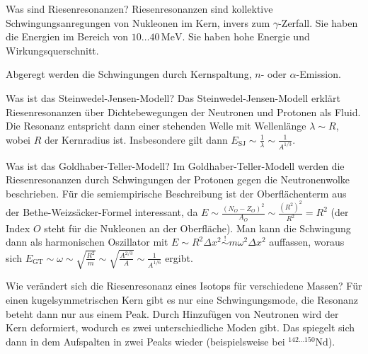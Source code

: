 
\begin{fquestion}{Was sind Riesenresonanzen?}
    Riesenresonanzen sind kollektive Schwingungsanregungen von Nukleonen im Kern, invers zum $\gamma$-Zerfall. 
    Sie haben die Energien im Bereich von $10\ldots 40\, \si{\mega\electronvolt}$. 
    Sie haben hohe Energie und Wirkungsquerschnitt.  
    
    Abgeregt werden die Schwingungen durch Kernspaltung, $n$- oder $\alpha$-Emission.
\end{fquestion}

\begin{fquestion}{Was ist das Steinwedel-Jensen-Modell?}
    Das Steinwedel-Jensen-Modell erklärt Riesenresonanzen über Dichtebewegungen der Neutronen und Protonen als Fluid.
    Die Resonanz entspricht dann einer stehenden Welle mit Wellenlänge $\lambda \sim R$, wobei  $R$ der Kernradius ist.
    Insbesondere gilt dann $E_\mathrm{SJ} \sim \frac{1}{\lambda} \sim \frac{1}{A^{1/3}}$.
\end{fquestion}

\begin{fquestion}{Was ist das Goldhaber-Teller-Modell?}
    Im Goldhaber-Teller-Modell werden die Riesenresonanzen durch Schwingungen der Protonen gegen die Neutronenwolke beschrieben.
    Für die semiempirische Beschreibung ist der Oberflächenterm aus der Bethe-Weizsäcker-Formel interessant, da $E\sim \frac{(N_O - Z_O)^2}{A_O} \sim \frac{ (R^2)^2}{R^2} = R^2$ (der Index $O$ steht für die Nukleonen an der Oberfläche).
    Man kann die Schwingung dann als harmonischen Oszillator mit $E\sim R^2\Delta x^2 \overset{!}{\sim} m\omega^2\Delta x^2$ auffassen, woraus sich $E_\mathrm{GT}\sim \omega\sim \sqrt{\frac{R^2}{m}} \sim \sqrt{\frac{A^{2/3}}{A}} \sim \frac{1}{A^{1/6}}$ ergibt.
\end{fquestion}

\begin{fquestion}{Wie verändert sich die Riesenresonanz eines Isotops für verschiedene Massen?}
    Für einen kugelsymmetrischen Kern gibt es nur eine Schwingungsmode, die Resonanz beteht dann nur aus einem Peak.
    Durch Hinzufügen von Neutronen wird der Kern deformiert, wodurch es zwei unterschiedliche Moden gibt. 
    Das spiegelt sich dann in dem Aufspalten in zwei Peaks wieder (beispielsweise bei ${}^{142\dots 150}\mathrm{Nd}$).
\end{fquestion}

